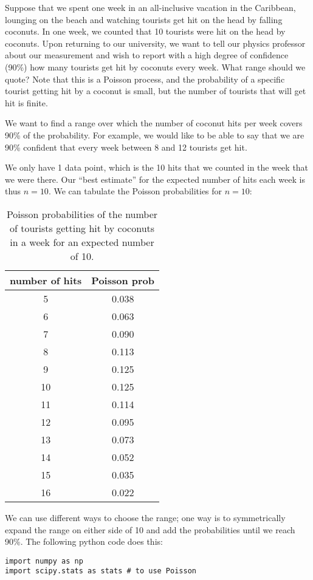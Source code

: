 \begin{example}{}{Suppose that we spent one week in an all-inclusive vacation in the Caribbean, lounging on the beach and watching tourists get hit on the head by falling coconuts. In one week, we counted that 10 tourists were hit on the head by coconuts. Upon returning to our university, we want to tell our physics professor about our measurement and wish to report with a high degree of confidence (90\%) how many tourists get hit by coconuts every week. What range should we quote?}{}
\label{ex:PoissonCoconut}
Note that this is a Poisson process, and the probability of a specific tourist getting hit by a coconut is small, but the number of tourists that will get hit is finite.

We want to find a range over which the number of coconut hits per week covers 90\% of the probability. For example, we would like to be able to say that we are 90\% confident that every week between 8 and 12 tourists get hit. 

We only have 1 data point, which is the 10 hits that we counted in the week that we were there. Our ``best estimate'' for the expected number of hits each week is thus $n=10$. We can tabulate the Poisson probabilities for $n=10$:

\begin{table}[h!]
\begin{tabular}{|c|c|}
\hline
number of hits & Poisson prob\\
\hline
5 & 0.038 \\
\hline
6 & 0.063 \\
\hline
7 & 0.090 \\
\hline
8 & 0.113 \\
\hline
9 & 0.125 \\
\hline
\cellcolor{gray!25} 10 & \cellcolor{gray!25} 0.125 \\
\hline
11 & 0.114 \\
\hline
12 & 0.095 \\
\hline
13 & 0.073 \\
\hline
14 & 0.052 \\
\hline
15 & 0.035 \\
\hline
16 & 0.022 \\
\hline
\end{tabular}
\caption{Poisson probabilities of the number of tourists getting hit by coconuts in a week for an expected number of 10.}
\end{table}

We can use different ways to choose the range; one way is to symmetrically expand the range on either side of 10 and add the probabilities until we reach 90\%. The following python code does this:
\begin{lstlisting}[frame=single] 
import numpy as np
import scipy.stats as stats # to use Poisson


\end{lstlisting}
\end{example}

